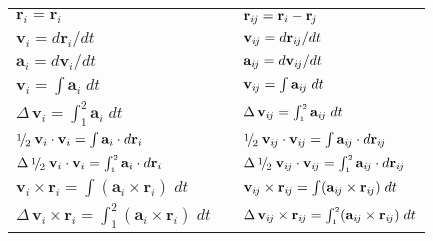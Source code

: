 \documentclass[10pt]{article}
\newcommand{\ri}{_i}
\newcommand{\vR}{\mathbf{r}}
\newcommand{\vV}{\mathbf{v}}
\newcommand{\vA}{\mathbf{a}}
\newcommand{\rj}{_{\hspace{-0.081em}j}}
\newcommand{\rij}{_{i\hspace{-0.081em}j}}
\newcommand{\med}{\raise.5ex\hbox{$\scriptstyle 1$}\kern-.15em/\kern-.12em\lower.45ex\hbox{$\scriptstyle 2$}\;}
\begin{document}
\begin{tabular}{lll}
\hspace{+0.30em} $\vR\ri = \vR\ri$ & \hspace{+8.70em} & $\vR\rij = \vR\ri - \vR\rj$ \vspace{+0.90em} \\
\hspace{+0.30em} $\vV\ri = d\vR\ri/dt$ & \hspace{+8.70em} & $\vV\rij = d\vR\rij/dt$ \vspace{+0.90em} \\
\hspace{+0.30em} $\vA\ri = d\vV\ri/dt$ & \hspace{+8.70em} & $\vA\rij = d\vV\rij/dt$ \vspace{+0.90em} \\
\hspace{+0.30em} $\vV\ri = \int \vA\ri \; dt$ & \hspace{+8.70em} & $\vV\rij = \int \vA\rij \; dt$ \vspace{+0.90em} \\
\hspace{+0.30em} $\Delta \, \vV\ri = \int_{\scriptscriptstyle 1}^{\scriptscriptstyle 2} \vA\ri \; dt$ & \hspace{+8.70em} & $\Delta \, \vV\rij = \int_{\scriptscriptstyle 1}^{\scriptscriptstyle 2} \vA\rij \; dt$ \vspace{+0.90em} \\
\hspace{+0.30em} $\med \vV\ri \cdot \vV\ri = \int \vA\ri \cdot d\vR\ri$ & \hspace{+8.70em} & $\med \vV\rij \cdot \vV\rij = \int \vA\rij \cdot d\vR\rij$ \vspace{+0.90em} \\
\hspace{+0.30em} $\Delta \, \med \vV\ri \cdot \vV\ri = \int_{\scriptscriptstyle 1}^{\scriptscriptstyle 2} \vA\ri \cdot d\vR\ri$ & \hspace{+8.70em} & $\Delta \, \med \vV\rij \cdot \vV\rij = \int_{\scriptscriptstyle 1}^{\scriptscriptstyle 2} \vA\rij \cdot d\vR\rij$ \vspace{+0.90em} \\
\hspace{+0.30em} $\vV\ri \times \vR\ri = \int (\vA\ri \times \vR\ri) \; dt$ & \hspace{+8.70em} & $\vV\rij \times \vR\rij = \int (\vA\rij \times \vR\rij) \; dt$ \vspace{+0.90em} \\
\hspace{+0.30em} $\Delta \, \vV\ri \times \vR\ri = \int_{\scriptscriptstyle 1}^{\scriptscriptstyle 2} (\vA\ri \times \vR\ri) \; dt$ & \hspace{+8.70em} & $\Delta \, \vV\rij \times \vR\rij = \int_{\scriptscriptstyle 1}^{\scriptscriptstyle 2} (\vA\rij \times \vR\rij) \; dt$
\end{tabular}
\end{document}
